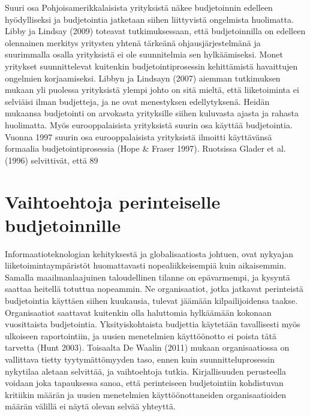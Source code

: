 \documentclass[12pt,a4paper,oneside,pdftex]{report}
\begin{document}
Suuri osa Pohjoisamerikkalaisista yrityksistä näkee budjetoinnin edelleen hyödylliseksi ja budjetointia jatketaan siihen liittyvistä ongelmista huolimatta. Libby ja Lindsay (2009) toteavat tutkimuksessaan, että budjetoinnilla on edelleen olennainen merkitys yritysten yhtenä tärkeänä ohjausjärjestelmänä ja suurimmalla osalla yrityksistä ei ole suunnitelmia sen hylkäämiseksi. Monet yritykset suunnittelevat kuitenkin budjetointiprosessin kehittämistä havaittujen ongelmien korjaamiseksi. Libbyn ja Lindsayn (2007) aiemman tutkimuksen mukaan yli puolessa yrityksistä ylempi johto on sitä mieltä, että liiketoiminta ei selviäisi ilman budjetteja, ja ne ovat menestyksen edellytyksenä. Heidän mukaansa budjetointi on arvokasta yrityksille siihen kuluvasta ajasta ja rahasta huolimatta. Myös eurooppalaisista yrityksistä suurin osa käyttää budjetointia. Vuonna 1997 suurin osa eurooppalaisista yrityksistä ilmoitti käyttävänsä formaalia budjetointiprosessia (Hope & Fraser 1997). Ruotsissa Glader et al. (1996) selvittivät, että 89 %

\chapter{Vaihtoehtoja perinteiselle budjetoinnille}
\label{chapter:vaihtoehtoja}

Informaatioteknologian kehityksestä ja globalisaatiosta johtuen, ovat nykyajan liiketoimintaympäristöt huomattavasti nopealiikkeisempiä kuin aikaisemmin. Samalla maailmanlaajuinen taloudellinen tilanne on epävarmempi, ja kysyntä saattaa heitellä totuttua nopeammin. Ne organisaatiot, jotka jatkavat perinteistä budjetointia käyttäen siihen kuukausia, tulevat jäämään kilpailijoidensa taakse. Organisaatiot saattavat kuitenkin olla haluttomia hylkäämään kokonaan vuosittaista budjetointia. Yksityiskohtaista budjettia käytetään tavallisesti myös ulkoiseen raportointiin, ja uusien menetelmien käyttöönotto ei poista tätä tarvetta (Hunt 2003). Toisaalta De Waalin (2011) mukaan organisaatiossa on vallittava tietty tyytymättömyyden taso, ennen kuin suunnitteluprosessin nykytilaa aletaan selvittää, ja vaihtoehtoja tutkia. Kirjallisuuden perusteella voidaan joka tapauksessa sanoa, että perinteiseen budjetointiin kohdistuvan kritiikin määrän ja uusien menetelmien käyttöönottaneiden organisaatioiden määrän välillä ei näytä olevan selvää yhteyttä.
\end{document}
